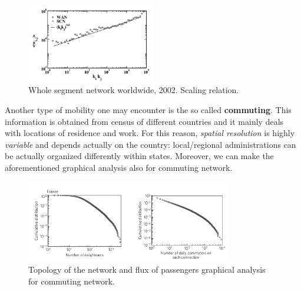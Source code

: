 \documentclass[../main/main.tex]{subfiles}
\begin{document}
\begin{figure}[h!]
\centering
\includegraphics[width=0.5\textwidth]{../lessons/image/14/image02.png}
\caption{\label{fig:13_02} Whole segment network worldwide, 2002. Scaling relation.}
\end{figure}

Another type of mobility one may encounter is the so called \textbf{commuting}. This information is obtained from census of different countries and it mainly deals with locations of residence and work. For this reason, \textit{spatial resolution} is highly \textit{variable} and depends actually on the country: local/regional administrations can be actually organized differently within states. Moreover, we can make the aforementioned graphical analysis also for commuting network.

\begin{figure}[h!]
\centering
\includegraphics[width=0.8\textwidth]{../lessons/image/14/image03.png}
\caption{\label{fig:13_03}  Topology of the network and flux of passengers graphical analysis for commuting network.}
\end{figure}
\end{document}
